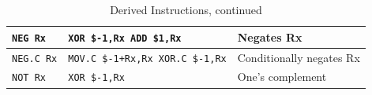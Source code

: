 \documentclass{gqtekspec}
\begin{document}
\begin{table}
\begin{center}
\begin{tabular}{p{1.1in}p{1.8in}p{3in}}
{\tt NEG Rx} & \parbox[t]{1.5in}{\tt XOR \$-1,Rx \\ ADD \$1,Rx} & Negates Rx\\\hline
{\tt NEG.C Rx} & \parbox[t]{1.5in}{\tt MOV.C \$-1+Rx,Rx\\XOR.C \$-1,Rx}
	& Conditionally negates Rx\\\hline
{\tt NOT Rx } & {\tt XOR \$-1,Rx } & One's complement\\\hline
\end{tabular}
\caption{Derived Instructions, continued}\label{tbl:derived-2}
\end{center}\end{table}
\end{document}
